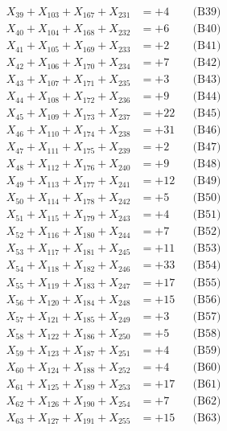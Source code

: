 \documentclass[a4paper,10pt]{article}
\begin{document}
{\begin{align}
X_{39} + X_{103} + X_{167} + X_{231} &= +4 && \text{(B39)} \\
X_{40} + X_{104} + X_{168} + X_{232} &= +6 && \text{(B40)} \\
\allowbreak
X_{41} + X_{105} + X_{169} + X_{233} &= +2 && \text{(B41)} \\
X_{42} + X_{106} + X_{170} + X_{234} &= +7 && \text{(B42)} \\
X_{43} + X_{107} + X_{171} + X_{235} &= +3 && \text{(B43)} \\
X_{44} + X_{108} + X_{172} + X_{236} &= +9 && \text{(B44)} \\
X_{45} + X_{109} + X_{173} + X_{237} &= +22 && \text{(B45)} \\
\allowbreak
X_{46} + X_{110} + X_{174} + X_{238} &= +31 && \text{(B46)} \\
X_{47} + X_{111} + X_{175} + X_{239} &= +2 && \text{(B47)} \\
X_{48} + X_{112} + X_{176} + X_{240} &= +9 && \text{(B48)} \\
X_{49} + X_{113} + X_{177} + X_{241} &= +12 && \text{(B49)} \\
X_{50} + X_{114} + X_{178} + X_{242} &= +5 && \text{(B50)} \\
\allowbreak
X_{51} + X_{115} + X_{179} + X_{243} &= +4 && \text{(B51)} \\
X_{52} + X_{116} + X_{180} + X_{244} &= +7 && \text{(B52)} \\
X_{53} + X_{117} + X_{181} + X_{245} &= +11 && \text{(B53)} \\
X_{54} + X_{118} + X_{182} + X_{246} &= +33 && \text{(B54)} \\
X_{55} + X_{119} + X_{183} + X_{247} &= +17 && \text{(B55)} \\
\allowbreak
X_{56} + X_{120} + X_{184} + X_{248} &= +15 && \text{(B56)} \\
X_{57} + X_{121} + X_{185} + X_{249} &= +3 && \text{(B57)} \\
X_{58} + X_{122} + X_{186} + X_{250} &= +5 && \text{(B58)} \\
X_{59} + X_{123} + X_{187} + X_{251} &= +4 && \text{(B59)} \\
X_{60} + X_{124} + X_{188} + X_{252} &= +4 && \text{(B60)} \\
\allowbreak
X_{61} + X_{125} + X_{189} + X_{253} &= +17 && \text{(B61)} \\
X_{62} + X_{126} + X_{190} + X_{254} &= +7 && \text{(B62)} \\
X_{63} + X_{127} + X_{191} + X_{255} &= +15 && \text{(B63)} \\
\end{align}
}
\end{document}
